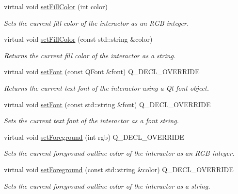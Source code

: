 \begin{DoxyCompactItemize}
virtual void \mbox{\hyperlink{classGDrawingSurface_a47fad447b715f2f303538434eed26709}{set\+Fill\+Color}} (int color)
\begin{DoxyCompactList}\small\item\em Sets the current fill color of the interactor as an R\+GB integer. \end{DoxyCompactList}\item 
virtual void \mbox{\hyperlink{classGDrawingSurface_adbc18b1a930aadd97d7437f9f7265b96}{set\+Fill\+Color}} (const std\+::string \&color)
\begin{DoxyCompactList}\small\item\em Returns the current fill color of the interactor as a string. \end{DoxyCompactList}\item 
virtual void \mbox{\hyperlink{classGCanvas_a2d22014c7fa3bccfd58c982aea1b55fa}{set\+Font}} (const Q\+Font \&font) Q\+\_\+\+D\+E\+C\+L\+\_\+\+O\+V\+E\+R\+R\+I\+DE
\begin{DoxyCompactList}\small\item\em Returns the current text font of the interactor using a Qt font object. \end{DoxyCompactList}\item 
virtual void \mbox{\hyperlink{classGCanvas_ab39ef411fb13a52852ddd138c5932e2e}{set\+Font}} (const std\+::string \&font) Q\+\_\+\+D\+E\+C\+L\+\_\+\+O\+V\+E\+R\+R\+I\+DE
\begin{DoxyCompactList}\small\item\em Sets the current text font of the interactor as a font string. \end{DoxyCompactList}\item 
virtual void \mbox{\hyperlink{classGCanvas_af9227e80cbfac55ce936fa5c99ffc954}{set\+Foreground}} (int rgb) Q\+\_\+\+D\+E\+C\+L\+\_\+\+O\+V\+E\+R\+R\+I\+DE
\begin{DoxyCompactList}\small\item\em Sets the current foreground outline color of the interactor as an R\+GB integer. \end{DoxyCompactList}\item 
virtual void \mbox{\hyperlink{classGCanvas_a088e04dfc56273df4cedab2b11b970f5}{set\+Foreground}} (const std\+::string \&color) Q\+\_\+\+D\+E\+C\+L\+\_\+\+O\+V\+E\+R\+R\+I\+DE
\begin{DoxyCompactList}\small\item\em Sets the current foreground outline color of the interactor as a string. \end{DoxyCompactList}\item 

\end{DoxyCompactItemize}
